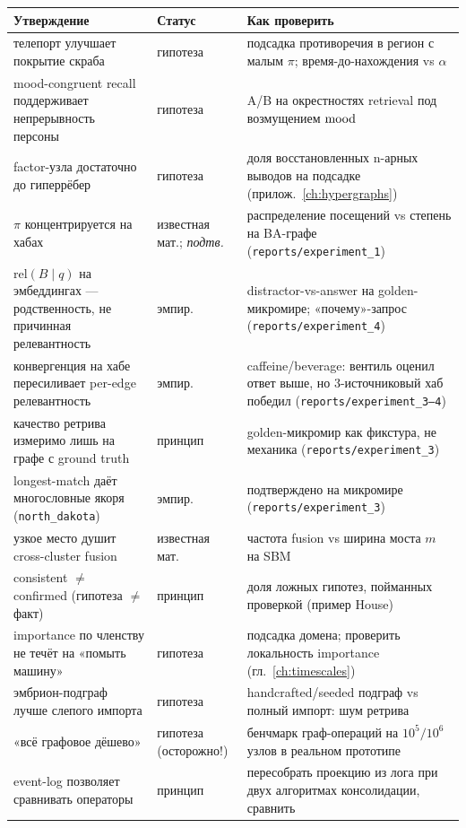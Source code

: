 \begin{center}
\begin{tabular}{p{} p{} p{}}
\toprule
\textbf{Утверждение} & \textbf{Статус} & \textbf{Как проверить} \\
\midrule
телепорт улучшает покрытие скраба & гипотеза & подсадка противоречия в регион с малым $\pi$; время-до-нахождения vs $\alpha$ \\
mood-congruent recall поддерживает непрерывность персоны & гипотеза & A/B на окрестностях retrieval под возмущением $\mathrm{mood}$ \\
factor-узла достаточно до гиперрёбер & гипотеза & доля восстановленных n-арных выводов на подсадке (прилож.~\ref{ch:hypergraphs}) \\
$\pi$ концентрируется на хабах & известная мат.; \emph{подтв.} & распределение посещений vs степень на BA-графе (\texttt{reports/experiment\_1}) \\
$\text{rel}(B\mid q)$ на эмбеддингах — родственность, не причинная релевантность & эмпир. & distractor-vs-answer на golden-микромире; «почему»-запрос (\texttt{reports/experiment\_4}) \\
конвергенция на хабе пересиливает per-edge релевантность & эмпир. & caffeine/beverage: вентиль оценил ответ выше, но 3-источниковый хаб победил (\texttt{reports/experiment\_3--4}) \\
качество ретрива измеримо лишь на графе с ground truth & принцип & golden-микромир как фикстура, не механика (\texttt{reports/experiment\_3}) \\
longest-match даёт многословные якоря (\texttt{north\_dakota}) & эмпир. & подтверждено на микромире (\texttt{reports/experiment\_3}) \\
узкое место душит cross-cluster fusion & известная мат. & частота fusion vs ширина моста $m$ на SBM \\
consistent $\ne$ confirmed (гипотеза $\ne$ факт) & принцип & доля ложных гипотез, пойманных проверкой (пример House) \\
importance по членству не течёт на «помыть машину» & гипотеза & подсадка домена; проверить локальность importance (гл.~\ref{ch:timescales}) \\
эмбрион-подграф лучше слепого импорта & гипотеза & handcrafted/seeded подграф vs полный импорт: шум ретрива \\
«всё графовое дёшево» & гипотеза (осторожно!) & бенчмарк граф-операций на $10^5/10^6$ узлов в реальном прототипе \\
event-log позволяет сравнивать операторы & принцип & пересобрать проекцию из лога при двух алгоритмах консолидации, сравнить \\
\bottomrule
\end{tabular}
\end{center}

